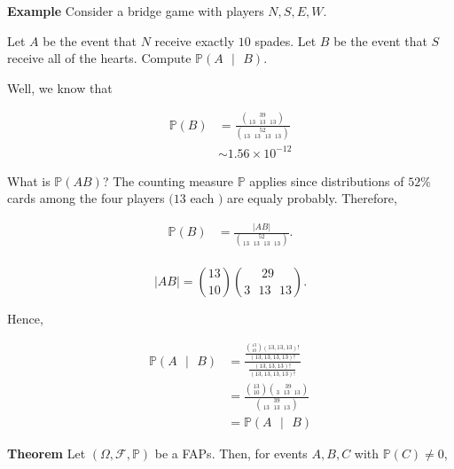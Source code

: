 \documentclass[12pt]{article}
\newcommand{\prob}[1]{\mathbb{P}(#1)}
\newcommand{\condprob}[2]{\mathbb{P}(#1 \text{ } \lvert \text{ } #2)}
\begin{document}
\vspace*{.3cm}
\begin{tcolorbox}
\textbf{Example} Consider a bridge game with players $N,S,E,W$.

\noindent
Let $A$ be the event that $N$ receive exactly $10$ spades. Let $B$ be the event that $S$ receive all of the hearts. Compute $\condprob{A}{B}$.

\noindent
Well, we know that 

\begin{align*}
\prob{B} & = \frac{{39 \choose 13 \text{ } 13 \text{ } 13}}{{52 \choose 13 \text{ } 13 \text{ } 13 \text{ } 13}} \\
& \sim 1.56 \times 10^{-12}
\end{align*}

\noindent
What is $\prob{AB}$? The counting measure $\mathbb{P}$ applies since distributions of $52\%$ cards among the four players $(13$ each $)$ are equaly probably. Therefore, 

\begin{align*}
\prob{B} & = \frac{\lvert AB \rvert}{{52 \choose 13 \text{ } 13 \text{ } 13 \text{ } 13}}. \\
\end{align*}

\noindent
\begin{equation*}
\lvert AB \rvert = {13 \choose 10}{29 \choose 3 \text{ } 13 \text{ } 13}.
\end{equation*}

\noindent
Hence, 

\begin{align*}
\condprob{A}{B} & = \frac{\frac{{13 \choose 10}  (13,13,13)!}{(13,13,13,13)!}}{\frac{(13,13,13)!}{(13,13,13,13)!}} \\
& = \frac{{13 \choose 10}{39 \choose 3 \text{ } 13 \text{ } 13}}{{39 \choose 13 \text{ } 13 \text{ } 13}} \\
& = \prob{A \text{ } \lvert \text{ } B}
\end{align*}
\end{tcolorbox}

\noindent
\textbf{Theorem} Let $(\Omega, \mathcal{F}, \mathbb{P})$ be a FAPs. Then, for events $A,B,C$ with $\prob{C} \neq 0$,
\end{document}
